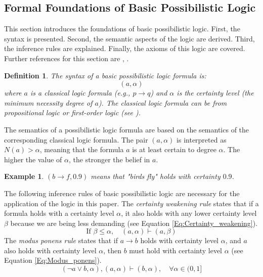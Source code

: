 \documentclass[seminar,english,m]{AIGpaper}
\newtheorem{definition}{Definition}
\newtheorem{example}{Example}
\begin{document}
\subsection{Formal Foundations of Basic Possibilistic Logic}
This section introduces the foundations of basic possibilistic logic. First, the syntax is presented. Second, the semantic aspects of the logic are derived. Third, the inference rules are explained. Finally, the axioms of this logic are covered. Further references for this section are \cite{dubois2014possibilistic}, \cite{hollunder1995alternative}.
\begin{definition}  
	The syntax of a basic possibilistic logic formula is:  
	\[
	(a, \alpha)
	\]  
	where \( a \) is a classical logic formula (e.g., \( p \to q \)) and \( \alpha \) is the certainty level (the minimum necessity degree of \( a \)). The classical logic formula can be from propositional logic or first-order logic (see \cite{dubois2014possibilistic}).  
\end{definition}  
The semantics of a possibilistic logic formula are based on the semantics of the corresponding classical logic formula. The pair \( \left( a , \alpha \right) \) is interpreted as \( N \left( a \right) > \alpha \), meaning that the formula \( a \) is at least certain to degree \( \alpha \). The higher the value of \( \alpha \), the stronger the belief in \( a \).  
\begin{example}  
	\((b \to f, 0.9)\) means that "birds fly" holds with certainty \( 0.9 \).  
\end{example}
The following inference rules of basic possibilistic logic are necessary for the application of the logic in this paper. The \textit{certainty weakening rule} states that if a formula holds with a certainty level \( \alpha \), it also holds with any lower certainty level \( \beta \) because we are being less demanding (see Equation \ref{Eq:Certainty_weakening}).
\begin{equation} \label{Eq:Certainty_weakening}
	\text{If } \beta \leq \alpha, \quad (a, \alpha) \vdash (a, \beta)
\end{equation}
The \textit{modus ponens rule} states that if \( a \to b \) holds with certainty level \( \alpha \), and \( a \) also holds with certainty level \( \alpha \), then \( b \) must hold with certainty level \( \alpha \) (see Equation \ref{Eq:Modus_ponens}).
\begin{equation}\label{Eq:Modus_ponens}
	(\neg a \lor b, \alpha), (a, \alpha) \vdash (b, \alpha), \quad \forall \alpha \in (0, 1]
\end{equation}  
\end{document}
